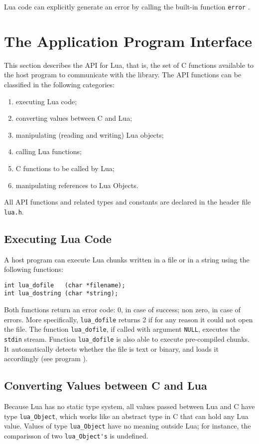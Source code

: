 Lua code can explicitly generate an error by calling the built-in
function \verb'error' .


\section{The Application Program Interface}

This section describes the API for Lua, that is,
the set of C functions available to the host program to communicate
with the library.
The API functions can be classified in the following categories:
\begin{enumerate}
\item executing Lua code;
\item converting values between C and Lua;
\item manipulating (reading and writing) Lua objects;
\item calling Lua functions;
\item C functions to be called by Lua;
\item manipulating references to Lua Objects.
\end{enumerate}
All API functions and related types and constants
are declared in the header file \verb'lua.h'.

\subsection{Executing Lua Code}
A host program can execute Lua chunks written in a file or in a string
using the following functions:
\begin{verbatim}
int lua_dofile   (char *filename);
int lua_dostring (char *string);
\end{verbatim}
Both functions return an error code:
0, in case of success; non zero, in case of errors.
More specifically, \verb'lua_dofile' returns 2 if for any reason
it could not open the file.
The function \verb'lua_dofile', if called with argument \verb'NULL',
executes the \verb|stdin| stream.
Function \verb'lua_dofile' is also able to execute pre-compiled chunks.
It automatically detects whether the file is text or binary,
and loads it accordingly (see program ).

\subsection{Converting Values between C and Lua} \label{valuesCLua}
Because Lua has no static type system,
all values passed between Lua and C have type
\verb'lua_Object',
which works like an abstract type in C that can hold any Lua value.
Values of type \verb'lua_Object' have no meaning outside Lua;
for instance,
the comparisson of two \verb"lua_Object's" is undefined.

